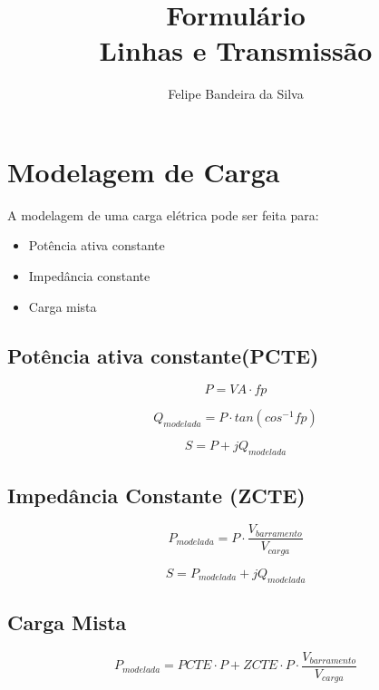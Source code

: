 \documentclass[ 10pt, twocolumn]{article}
\title{Formulário\\Linhas e Transmissão}
\author{Felipe Bandeira da Silva}
\begin{document}
\maketitle
\section{Modelagem de Carga}

A modelagem de uma carga elétrica pode ser feita para:

\begin{itemize}
\item Potência ativa constante
\item Impedância constante
\item Carga mista
\end{itemize}

\subsection{Potência ativa constante(PCTE)}
    
\begin{equation}
P = VA \cdot fp
\end{equation}

\begin{equation}   
Q_{modelada} = P \cdot tan(cos^{-1}fp)
\end{equation}

\begin{equation}
S = P+jQ_{modelada}
\end{equation}

\subsection{Impedância Constante (ZCTE)}

\begin{equation}
P_{modelada} = P \cdot \frac{V_{barramento}}{V_{carga}}
\end{equation}

\begin{equation}   
S = P_{modelada} + jQ_{modelada}  
\end{equation}

\subsection{Carga Mista}

\begin{equation}
P_{modelada} =PCTE \cdot P +  ZCTE \cdot  P \cdot \frac{V_{barramento}}{V_{carga}}
\end{equation}
\end{document}
